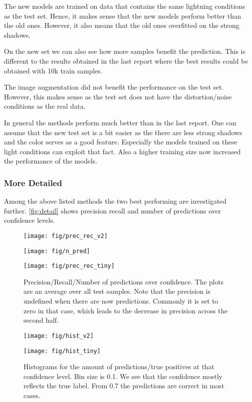 \documentclass{article}
\begin{document}
The new models are trained on data that contains the same lightning conditions as the test set. Hence, it makes sense that the new models perform better than the old ones. However, it also means that the old ones overfitted on the strong shadows. 

On the new set we can also see how more samples benefit the prediction. This is different to the results obtained in the last report where the best results could be obtained with 10k train samples.

The image augmentation did not benefit the performance on the test set. However, this makes sense as the test set does not have the distortion/noise conditions as the real data.

In general the methods perform much better than in the last report. One can assume that the new test set is a bit easier as the there are less strong shadows and the color serves as a good feature. Especially the models trained on these light conditions can exploit that fact. Also a higher training size now increased the performance of the models.

\subsubsection{More Detailed}

Among the above listed methods the two best performing are investigated further. \autoref{fig:detail} shows precision recall and number of predictions over confidence levels.
\begin{figure}[h]
	\centering
		
		\begin{minipage}{0.32\textwidth}
			\centering
			\texttt{[image: fig/prec\_rec\_v2]}
		\end{minipage}
			\begin{minipage}{0.32\textwidth}
				\centering
				\texttt{[image: fig/n\_pred]}
			\end{minipage}
	\begin{minipage}{0.32\textwidth}
		\centering
		\texttt{[image: fig/prec\_rec\_tiny]}
	\end{minipage}
	\caption{Precision/Recall/Number of predictions over confidence. The plots are an average over all test samples. Note that the precision is undefined when there are now predictions. Commonly it is set to zero in that case, which leads to the decrease in precision across the second half.}
	\label{fig:detail}	
	\begin{minipage}{0.45\textwidth}
		\centering
		\texttt{[image: fig/hist\_v2]}
	\end{minipage}
	\begin{minipage}{0.45\textwidth}
		\centering
		\texttt{[image: fig/hist\_tiny]}
	\end{minipage}
	\caption{Histograms for the amount of predictions/true positives at that confidence level. Bin size is 0.1. We see that the confidence mostly reflects the true label. From 0.7 the predictions are correct in most cases.}
	\label{fig:hist}

\end{figure}
\end{document}
